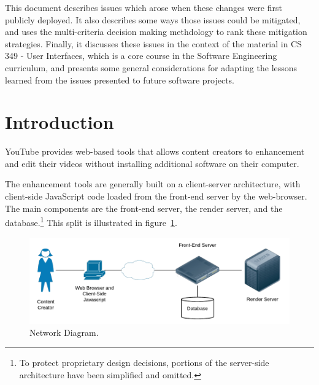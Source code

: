 \documentclass[se,resubmit]{uw-wkrpt}
\begin{document}
This document describes issues which arose when these changes were first
publicly deployed. It also describes some ways those issues could be
mitigated, and uses the multi-criteria decision making methdology to rank
these mitigation strategies. Finally, it discusses these issues in the
context of the material in CS 349 - User Interfaces, which is a core
course in the Software Engineering curriculum, and presents some general
considerations for adapting the lessons learned from the issues presented
to future software projects.

\tableofcontents
\listoffigures
\listoftables

\mainmatter

\section{Introduction}\label{sec:intro}
YouTube provides web-based tools that allows content creators to
enhancement and edit their videos without installing additional software on
their computer.

The enhancement tools are generally built on a client-server architecture,
with client-side JavaScript code loaded from the front-end server by the
web-browser. The main components are the front-end server, the render
server, and the database.\footnote{To protect proprietary design decisions,
portions of the server-side architecture have been simplified and omitted.}
This split is illustrated in figure~\ref{fig:network-diagram}.

\begin{figure}
  \centering
  \includegraphics{network-diagram}
  \caption{Network Diagram.}
  \label{fig:network-diagram}
\end{figure}
\end{document}
